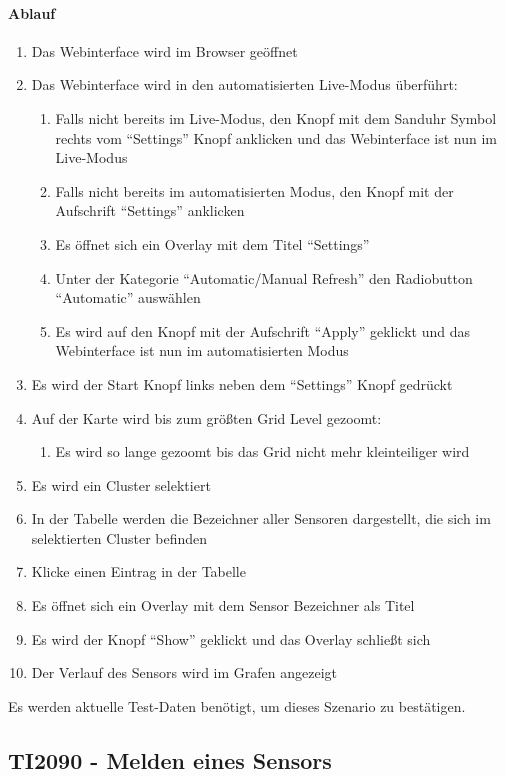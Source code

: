 \paragraph{Ablauf}
\begin{enumerate}
\item Das Webinterface wird im Browser geöffnet
\item Das Webinterface wird in den automatisierten Live-Modus überführt:
\begin{enumerate}
\item Falls nicht bereits im Live-Modus, den Knopf mit dem Sanduhr Symbol rechts vom ``Settings'' Knopf anklicken und das Webinterface ist nun im Live-Modus
\item Falls nicht bereits im automatisierten Modus, den Knopf mit der Aufschrift ``Settings'' anklicken
\item Es öffnet sich ein Overlay mit dem Titel ``Settings''
\item Unter der Kategorie ``Automatic/Manual Refresh'' den Radiobutton ``Automatic'' auswählen
\item Es wird auf den Knopf mit der Aufschrift ``Apply'' geklickt und das Webinterface ist nun im automatisierten Modus
\end{enumerate} 
\item Es wird der Start Knopf links neben dem ``Settings'' Knopf gedrückt
\item Auf der Karte wird bis zum größten Grid Level gezoomt:
\begin{enumerate}
\item Es wird so lange gezoomt bis das Grid nicht mehr kleinteiliger wird
\end{enumerate}
\item Es wird ein Cluster selektiert
\item In der Tabelle werden die Bezeichner aller Sensoren dargestellt, die sich im selektierten Cluster befinden
\item Klicke einen Eintrag in der Tabelle
\item Es öffnet sich ein Overlay mit dem Sensor Bezeichner als Titel
\item Es wird der Knopf ``Show'' geklickt und das Overlay schließt sich
\item Der Verlauf des Sensors wird im Grafen angezeigt
\end{enumerate}
\szenarioBad
Es werden aktuelle Test-Daten benötigt, um dieses Szenario zu bestätigen.

\subsection{TI2090 - Melden eines Sensors}
